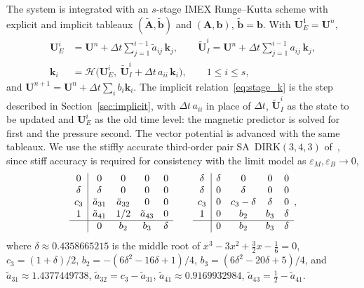\documentclass[a4paper,fleqn]{cas-sc}
\theoremstyle{remark}
\newcommand{\eps}{\varepsilon}
\newcommand{\epsM}{\eps_{M}}
\newcommand{\epsB}{\eps_{B}}
\begin{document}
The system is integrated with an $s$-stage IMEX Runge--Kutta scheme with explicit
and implicit tableaux $(\tilde{\mathbf A},\tilde{\mathbf b})$ and
$(\mathbf A,\mathbf b)$, $\tilde{\mathbf b}=\mathbf b$. With
$\mathbf{U}_E^{1}=\mathbf{U}^{n}$,
\begin{align}
\label{eq:stage_E}
\mathbf{U}_E^{i}&=\mathbf{U}^{n}+\Delta t\sum_{j=1}^{i-1}\tilde a_{ij}\,\mathbf k_j,
\qquad
\tilde{\mathbf{U}}_I^{i}=\mathbf{U}^{n}+\Delta t\sum_{j=1}^{i-1}a_{ij}\,\mathbf k_j,\\
\label{eq:stage_k}
\mathbf k_i&=\mathcal H\big(\mathbf{U}_E^{i},\ \tilde{\mathbf{U}}_I^{i}+\Delta t\,a_{ii}\,\mathbf k_i\big),
\qquad 1\le i\le s,
\end{align}
and $\mathbf{U}^{n+1}=\mathbf{U}^{n}+\Delta t\sum_ib_i\mathbf k_i$. The implicit
relation~\eqref{eq:stage_k} is the step described in
Section~\ref{sec:implicit}, with $\Delta t\,a_{ii}$ in place of $\Delta t$,
$\tilde{\mathbf{U}}_I^{i}$ as the state to be updated and $\mathbf{U}_E^{i}$ as
the old time level: the magnetic predictor is solved for first and the pressure
second. The vector potential is advanced with the same tableaux. We use the
stiffly accurate third-order pair SA~DIRK$(3,4,3)$ of~\cite{BoscheriPareschi2021}, since stiff accuracy is required for consistency with the limit model as
$\epsM,\epsB\to0$,
\begin{equation}
\label{eq:sadirk343}
\begin{array}{c|cccc}
0        & 0        & 0         & 0         & 0\\
\delta   & \delta   & 0         & 0         & 0\\
c_3      & \tilde a_{31} & \tilde a_{32} & 0  & 0\\
1        & \tilde a_{41} & 1/2  & \tilde a_{43} & 0\\\hline
         & 0        & b_2  & b_3 & \delta
\end{array}
\qquad
\begin{array}{c|cccc}
\delta   & \delta & 0        & 0         & 0\\
\delta   & 0      & \delta   & 0         & 0\\
c_3      & 0      & c_3-\delta & \delta    & 0\\
1        & 0      & b_2 & b_3 & \delta\\\hline
         & 0      & b_2 & b_3 & \delta
\end{array},
\end{equation}
where $\delta\approx0.4358665215$ is the middle root of
$x^{3}-3x^{2}+\tfrac32x-\tfrac16=0$, $c_3=(1+\delta)/2$,
$b_2=-(6\delta^{2}-16\delta+1)/4$, $b_3=(6\delta^{2}-20\delta+5)/4$, and
$\tilde a_{31}\approx1.4377449738$, $\tilde a_{32}=c_3-\tilde a_{31}$,
$\tilde a_{41}\approx0.9169932984$, $\tilde a_{43}=\tfrac12-\tilde a_{41}$.
\end{document}
